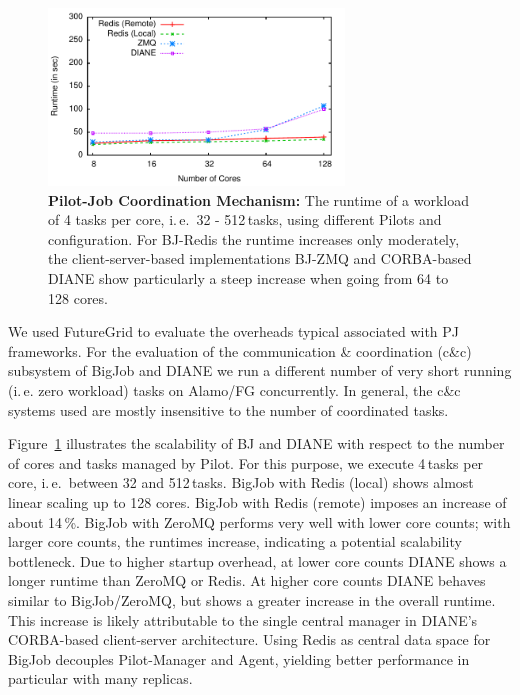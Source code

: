 \documentclass[]{paper}
\begin{document}
\begin{figure}
	\centering
\includegraphics[width=0.7\textwidth]{figures/bigjob-varying-cores-alamo-noadvert.pdf}
\caption{\textbf{Pilot-Job Coordination Mechanism:}  The runtime of a
workload of 4 tasks per core, i.\,e.\ 32 - 512\,tasks, using different Pilots
and configuration. For BJ-Redis the runtime  increases only moderately, the
client-server-based implementations BJ-ZMQ and CORBA-based DIANE show
particularly a steep increase when going from 64 to 128 cores.}
\label{fig:perf_bigjob-varying-cores}
\end{figure}




We used FutureGrid to evaluate the overheads typical associated with PJ
frameworks. For the evaluation of the communication \& coordination (c\&c)
subsystem of BigJob and DIANE we run a different number of very short running
(i.\,e. zero workload) tasks on Alamo/FG concurrently. In general, the c\&c
systems used are mostly insensitive to the number of coordinated tasks.

Figure~\ref{fig:perf_bigjob-varying-cores} illustrates the scalability of BJ
and DIANE with respect to the number of cores and tasks managed by Pilot. For
this purpose, we execute 4\,tasks per core, i.\,e.\ between 32 and 512\,tasks.
BigJob with Redis (local) shows almost linear scaling up to 128 cores. BigJob
with Redis (remote) imposes an increase of about 14\,\%. BigJob with ZeroMQ
performs very well with lower core counts; with larger core counts, the
runtimes increase, indicating a potential scalability bottleneck. Due to
higher startup overhead, at lower core counts DIANE shows a longer runtime
than ZeroMQ or Redis. At higher core counts DIANE behaves similar to
BigJob/ZeroMQ, but shows a greater increase in the overall runtime. This
increase is likely attributable to the single central manager in DIANE's
CORBA-based client-server architecture. Using Redis as central data space for
BigJob decouples Pilot-Manager and Agent, yielding better performance in
particular with many replicas.
\end{document}
